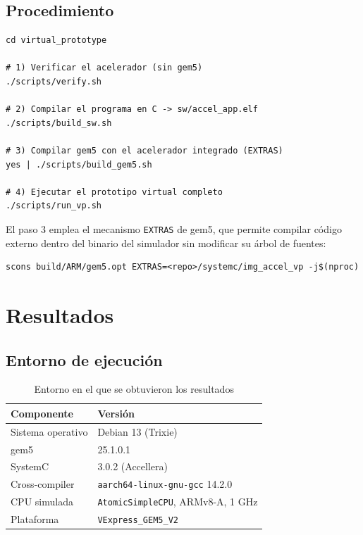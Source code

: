 \documentclass[11pt,letterpaper]{article}
\begin{document}
\subsection{Procedimiento}

\begin{lstlisting}[style=shstyle,caption={Construccion y ejecucion del prototipo virtual.}]
cd virtual_prototype

# 1) Verificar el acelerador (sin gem5)
./scripts/verify.sh

# 2) Compilar el programa en C -> sw/accel_app.elf
./scripts/build_sw.sh

# 3) Compilar gem5 con el acelerador integrado (EXTRAS)
yes | ./scripts/build_gem5.sh

# 4) Ejecutar el prototipo virtual completo
./scripts/run_vp.sh
\end{lstlisting}

El paso 3 emplea el mecanismo \texttt{EXTRAS} de gem5, que permite compilar
código externo dentro del binario del simulador sin modificar su árbol de
fuentes:

\begin{lstlisting}[style=shstyle]
scons build/ARM/gem5.opt EXTRAS=<repo>/systemc/img_accel_vp -j$(nproc)
\end{lstlisting}

\newpage
\section{Resultados}
\label{sec:resultados-vp}

\subsection{Entorno de ejecución}

\begin{table}[H]
\centering
\caption{Entorno en el que se obtuvieron los resultados}
\begin{tabular}{@{}ll@{}}
\toprule
\textbf{Componente} & \textbf{Versión} \\
\midrule
Sistema operativo   & Debian 13 (Trixie) \\
gem5                & 25.1.0.1 \\
SystemC             & 3.0.2 (Accellera) \\
Cross-compiler      & \texttt{aarch64-linux-gnu-gcc} 14.2.0 \\
CPU simulada        & \texttt{AtomicSimpleCPU}, ARMv8-A, 1 GHz \\
Plataforma          & \texttt{VExpress\_GEM5\_V2} \\
\bottomrule
\end{tabular}
\end{table}
\end{document}
